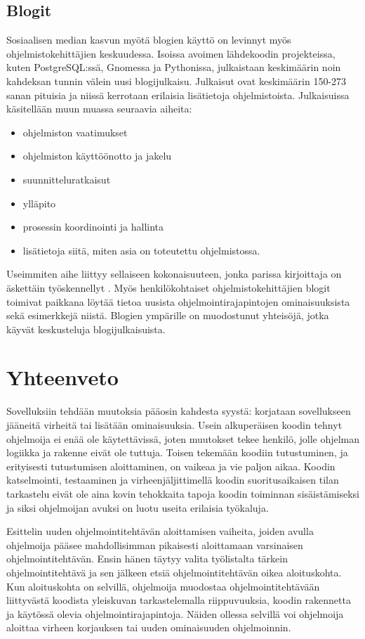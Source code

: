 \documentclass[finnish]{tktltiki2}
\theoremstyle{definition}
\theoremstyle{remark}
\begin{document}
\subsection{Blogit}
Sosiaalisen median kasvun myötä blogien käyttö on levinnyt myös ohjelmistokehittäjien keskuudessa. Isoissa avoimen lähdekoodin projekteissa, kuten PostgreSQL:ssä, Gnomessa ja Pythonissa, julkaistaan keskimäärin noin kahdeksan tunnin välein uusi blogijulkaisu. Julkaisut ovat keskimäärin 150-273 sanan pituisia ja niissä kerrotaan erilaisia lisätietoja ohjelmistoista. Julkaisuissa käsitellään muun muassa seuraavia aiheita:
\begin{itemize}
  \item ohjelmiston vaatimukset
  \item ohjelmiston käyttöönotto ja jakelu
  \item suunnitteluratkaisut
  \item ylläpito
  \item prosessin koordinointi ja hallinta
\item lisätietoja siitä, miten asia on toteutettu ohjelmistossa.
\end{itemize}

Useimmiten aihe liittyy sellaiseen kokonaisuuteen, jonka parissa kirjoittaja on äskettäin työskennellyt \cite{how-dev-blog}.
Myös henkilökohtaiset ohjelmistokehittäjien blogit toimivat paikkana löytää tietoa uusista ohjelmointirajapintojen ominaisuuksista sekä esimerkkejä niistä. Blogien ympärille on muodostunut yhteisöjä, jotka käyvät keskusteluja blogijulkaisuista.

\section{Yhteenveto}

Sovelluksiin tehdään muutoksia pääosin kahdesta syystä: korjataan sovellukseen jääneitä virheitä tai lisätään ominaisuuksia. Usein alkuperäisen koodin tehnyt ohjelmoija ei enää ole käytettävissä, joten muutokset tekee henkilö, jolle ohjelman logiikka ja rakenne eivät ole tuttuja.
Toisen tekemään koodiin tutustuminen, ja erityisesti tutustumisen aloittaminen, on vaikeaa ja vie paljon aikaa. Koodin katselmointi, testaaminen ja virheenjäljittimellä koodin suoritusaikaisen tilan tarkastelu eivät ole aina kovin tehokkaita tapoja koodin toiminnan sisäistämiseksi ja siksi ohjelmoijan avuksi on luotu useita erilaisia työkaluja.

Esittelin uuden ohjelmointitehtävän aloittamisen vaiheita, joiden avulla ohjelmoija pääsee mahdollisimman pikaisesti aloittamaan varsinaisen ohjelmointitehtävän. Ensin hänen täytyy valita työlistalta tärkein ohjelmointitehtävä ja sen jälkeen etsiä ohjelmointitehtävän oikea aloituskohta. Kun aloituskohta on selvillä, ohjelmoija muodostaa ohjelmointitehtävään liittyvästä koodista yleiskuvan tarkastelemalla riippuvuuksia, koodin rakennetta ja käytössä olevia ohjelmointirajapintoja. Näiden ollessa selvillä voi ohjelmoija aloittaa virheen korjauksen tai uuden ominaisuuden ohjelmoinnin.
\end{document}
